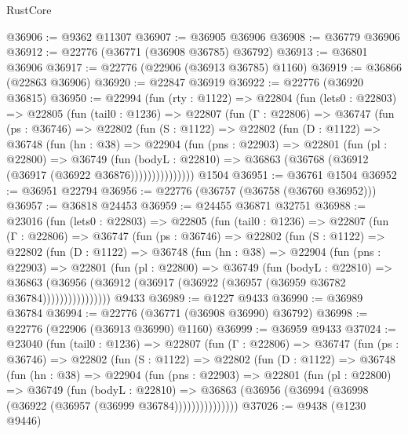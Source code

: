 \begin{lexlean}{RustCore}
\begin{coremodule}
@36906 := @9362 @11307
@36907 := @36905 @36906
@36908 := @36779 @36906
@36912 := @22776 (@36771 (@36908 @36785) @36792)
@36913 := @36801 @36906
@36917 := @22776 (@22906 (@36913 @36785) @1160)
@36919 := @36866 (@22863 @36906)
@36920 := @22847 @36919
@36922 := @22776 (@36920 @36815)
@36950 := @22994
    (fun (rty : @1122) =>
    @22804
      (fun (lets0 : @22803) =>
      @22805
        (fun (tail0 : @1236) =>
        @22807
          (fun (Γ : @22806) =>
          @36747
            (fun (ps : @36746) =>
            @22802
              (fun (S : @1122) =>
              @22802
                (fun (D : @1122) =>
                @36748
                  (fun (hn : @38) =>
                  @22904
                    (fun (pns : @22903) =>
                    @22801
                      (fun (pl : @22800) =>
                      @36749
                        (fun (bodyL : @22810) =>
                        @36863 (@36768 (@36912 (@36917 (@36922 @36876)))))))))))))))
    @1504
@36951 := @36761 @1504
@36952 := @36951 @22794
@36956 := @22776 (@36757 (@36758 (@36760 @36952)))
@36957 := @36818 @24453
@36959 := @24455 @36871 @32751
@36988 := @23016
    (fun (lets0 : @22803) =>
    @22805
      (fun (tail0 : @1236) =>
      @22807
        (fun (Γ : @22806) =>
        @36747
          (fun (ps : @36746) =>
          @22802
            (fun (S : @1122) =>
            @22802
              (fun (D : @1122) =>
              @36748
                (fun (hn : @38) =>
                @22904
                  (fun (pns : @22903) =>
                  @22801
                    (fun (pl : @22800) =>
                    @36749
                      (fun (bodyL : @22810) =>
                      @36863
                        (@36956
                          (@36912 (@36917 (@36922 (@36957 (@36959 @36782 @36784))))))))))))))))
    @9433
@36989 := @1227 @9433
@36990 := @36989 @36784
@36994 := @22776 (@36771 (@36908 @36990) @36792)
@36998 := @22776 (@22906 (@36913 @36990) @1160)
@36999 := @36959 @9433
@37024 := @23040
    (fun (tail0 : @1236) =>
    @22807
      (fun (Γ : @22806) =>
      @36747
        (fun (ps : @36746) =>
        @22802
          (fun (S : @1122) =>
          @22802
            (fun (D : @1122) =>
            @36748
              (fun (hn : @38) =>
              @22904
                (fun (pns : @22903) =>
                @22801
                  (fun (pl : @22800) =>
                  @36749
                    (fun (bodyL : @22810) =>
                    @36863 (@36956 (@36994 (@36998 (@36922 (@36957 (@36999 @36784)))))))))))))))
@37026 := @9438 (@1230 @9446)

\end{coremodule}
\end{lexlean}
